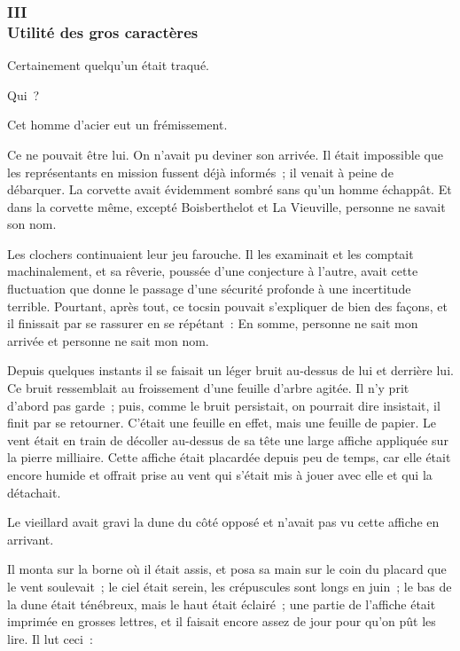 \documentclass[french,twoside]{book} %
\begin{document}
 \subsubsection[{III. Utilité des gros caractères}]{III \\
Utilité des gros caractères}
\label{p1l4c3}
\noindent Certainement quelqu’un était traqué.\par
Qui ?\par
Cet homme d’acier eut un frémissement.\par
Ce ne pouvait être lui. On n’avait pu deviner son arrivée. Il était impossible que les représentants en mission fussent déjà informés ; il venait à peine de débarquer. La corvette avait évidemment sombré sans qu’un homme échappât. Et dans la corvette même, excepté Boisberthelot et La Vieuville, personne ne savait son nom.\par
Les clochers continuaient leur jeu farouche. Il les examinait et les comptait machinalement, et sa rêverie, poussée d’une conjecture à l’autre, avait cette fluctuation que donne le passage d’une sécurité profonde à une incertitude terrible. Pourtant, après tout, ce tocsin pouvait s’expliquer de bien des façons, et il finissait par se rassurer en se répétant : En somme, personne ne sait mon arrivée et personne ne sait mon nom.\par
Depuis quelques instants il se faisait un léger bruit au-dessus de lui et derrière lui. Ce bruit ressemblait  au froissement d’une feuille d’arbre agitée. Il n’y prit d’abord pas garde ; puis, comme le bruit persistait, on pourrait dire insistait, il finit par se retourner. C’était une feuille en effet, mais une feuille de papier. Le vent était en train de décoller au-dessus de sa tête une large affiche appliquée sur la pierre milliaire. Cette affiche était placardée depuis peu de temps, car elle était encore humide et offrait prise au vent qui s’était mis à jouer avec elle et qui la détachait.\par
Le vieillard avait gravi la dune du côté opposé et n’avait pas vu cette affiche en arrivant.\par
Il monta sur la borne où il était assis, et posa sa main sur le coin du placard que le vent soulevait ; le ciel était serein, les crépuscules sont longs en juin ; le bas de la dune était ténébreux, mais le haut était éclairé ; une partie de l’affiche était imprimée en grosses lettres, et il faisait encore assez de jour pour qu’on pût les lire. Il lut ceci :\par
\end{document}

